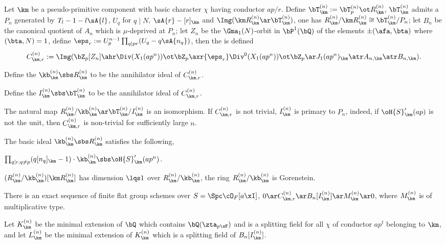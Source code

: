 \documentclass[article, a4paper, twoside]{universal}
\begin{document}
\begin{dfn}[{\cite[4.3~Definition, 5.1]{MW1984}}]
	Let $\km$ be a pseudo-primitive component with basic character $\chi$ having conductor $ap/r$. Define $\bT^{(n)}_{\km}:=\bT^{(n)}_{p}\ot R_{\km}^{(n)}$, $\bT_{\km}^{(n)}$ admits a  $P_{n}$ generated by $T_{l}-1-l\sA{l}$, $U_{q}$ for $q\mid N$, $\sA{r}-[r]_{\km}$ and $\Img(\km R_{\km}^{(n)}\ar\bT_{\km}^{(n)})$, one has $R_{\km}^{(n)}/\km R_{\km}^{(n)}\cong \bT_{\km}^{(n)}/P_{n}$; let $B_{n}$ be the canonical quotient of $A_{n}$ which is $\mu$-deprived at $P_{n}$; let $Z_{n}$ be the $\Gma_{1}(N)$-orbit in $\bP^{1}(\bQ)$ of the elements $\pm(\afa,\bta)$ where $(\bta,N)=1$, define $\eps_{r}:=U_{p}^{n-1}\prod_{q\mid pr}(U_{q}-q\sA{n_{q}})$, then the  is defined
	\[
		C_{\km,r}^{(n)}:=\Img(\bZ_{p}[Z_{n}]\ahr\Div(X_{1}(ap^{n}))\ot\bZ_{p}\axr{\eps_{r}}\Div^{0}(X_{1}(ap^{n}))\ot\bZ_{p}\ar J_{1}(ap^{n})_{\km}\atr A_{n,\km}\atr B_{n,\km}).
	\]
	\begin{itm}
		\item Define the  $\kb_{\km}^{(n)}\sbs R_{\km}^{(n)}$ to be the annihilator ideal of $C_{\km,r}^{(n)}$.
		\item Define the  $I_{\km}^{(n)}\sbs\bT_{\km}^{(n)}$ to be the annihilator ideal of $C_{\km,r}^{(n)}$.
	\end{itm}
	The natural map $R_{\km}^{(n)}/\kb_{\km}^{(n)}\ar\bT_{\km}^{(n)}/I_{\km}^{(n)}$ is an isomorphism. If $C_{\km,r}^{(n)}$ is not trivial, $I_{\km}^{(n)}$ is primary to $P_{n}$, indeed, if $\oH{S}_{\km}'(ap)$ is not the unit, then $C_{\km,r}^{(n)}$ is non-trivial for sufficiently large $n$.
\end{dfn}

\begin{thm}[{\cite[4.3~Theorem]{MW1984}}]
	The basic ideal $\kb_{\km}^{(n)}\sbs R_{\km}^{(n)}$ satisfies the following,
	\begin{itm}
		\item $\prod_{q\mid r, q\neq p}(q[n_{q}]_{\km}-1)\cdot \kb_{\km}^{(n)}\sbs\oH{S}_{\km}'(ap^{n})$.
		\item $(R_{\km}^{(n)}/\kb_{\km}^{(n)})[\km R_{\km}^{(n)}]$ has dimension $\lqs1$ over $R_{\km}^{(n)}/\kb_{\km}^{(n)}$, the ring $R_{\km}^{(n)}/\kb_{\km}^{(n)}$ is Gorenstein.
	\end{itm}
\end{thm}

\begin{dfn}[{\cite[5.2~Lemma~4]{MW1984}}]
	There is an exact sequence of finite flat group schemes over $S=\Spc\cO_{F}[a\xI]$, $0\ar C_{\km,r}^{(n)}\ar B_{n}[I_{\km}^{(n)}] \ar M_{\km}^{(n)}\ar 0$, where $M_{\km}^{(n)}$ is of multiplicative type.

	Let $K_{\km}^{(n)}$ be the minimal extension of $\bQ$ which contains $\bQ(\zta_{p\xF})$ and is a splitting field for all $\chi$ of conductor $ap^{t}$ belonging to $\km$, and let $L_{\km}^{(n)}$ be the minimal extension of $K_{\km}^{(n)}$ which is a splitting field of $B_{n}[I_{\km}^{(n)}]$.
\end{dfn}
\end{document}
